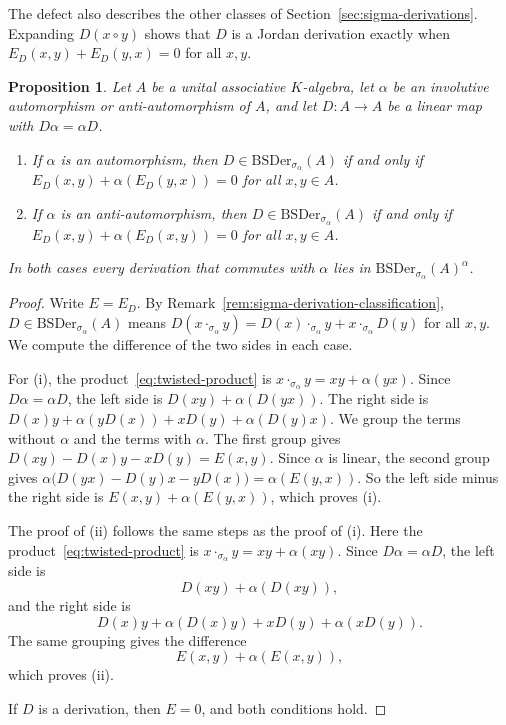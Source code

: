 \documentclass[]{interact}
\theoremstyle{plain}
\newtheorem{proposition}[theorem]{Proposition}
\theoremstyle{definition}
\theoremstyle{remark}
\newcommand{\BSDer}{\mathrm{BSDer}}
\begin{document}
The defect also describes the other classes of Section~\ref{sec:sigma-derivations}.
Expanding $D(x \circ y)$ shows that $D$ is a Jordan derivation exactly when $E_D(x,y) + E_D(y,x) = 0$ for all $x, y$.

\begin{proposition}\label{prop:defect}
Let $A$ be a unital associative $K$-algebra, let $\alpha$ be an involutive automorphism or anti-automorphism of $A$, and let $D \colon A \to A$ be a linear map with $D\alpha = \alpha D$.
\begin{enumerate}[label=(\roman*)]
\item If $\alpha$ is an automorphism, then $D \in \BSDer_{\sigma_\alpha}(A)$ if and only if $E_D(x,y) + \alpha(E_D(y,x)) = 0$ for all $x, y \in A$.
\item If $\alpha$ is an anti-automorphism, then $D \in \BSDer_{\sigma_\alpha}(A)$ if and only if $E_D(x,y) + \alpha(E_D(x,y)) = 0$ for all $x, y \in A$.
\end{enumerate}
In both cases every derivation that commutes with $\alpha$ lies in $\BSDer_{\sigma_\alpha}(A)^\alpha$.
\end{proposition}

\begin{proof}
Write $E = E_D$.
By Remark~\ref{rem:sigma-derivation-classification}, $D \in \BSDer_{\sigma_\alpha}(A)$ means $D(x \cdot_{\sigma_\alpha} y) = D(x) \cdot_{\sigma_\alpha} y + x \cdot_{\sigma_\alpha} D(y)$ for all $x, y$.
We compute the difference of the two sides in each case.

For (i), the product~\eqref{eq:twisted-product} is $x \cdot_{\sigma_\alpha} y = xy + \alpha(yx)$.
Since $D\alpha = \alpha D$, the left side is $D(xy) + \alpha(D(yx))$.
The right side is $D(x)y + \alpha(yD(x)) + xD(y) + \alpha(D(y)x)$.
We group the terms without $\alpha$ and the terms with $\alpha$.
The first group gives $D(xy) - D(x)y - xD(y) = E(x,y)$.
Since $\alpha$ is linear, the second group gives $\alpha\bigl(D(yx) - D(y)x - yD(x)\bigr) = \alpha(E(y,x))$.
So the left side minus the right side is $E(x,y) + \alpha(E(y,x))$, which proves (i).

The proof of (ii) follows the same steps as the proof of (i).
Here the product~\eqref{eq:twisted-product} is $x \cdot_{\sigma_\alpha} y = xy + \alpha(xy)$.
Since $D\alpha = \alpha D$, the left side is
\[
D(xy) + \alpha(D(xy)),
\]
and the right side is
\[
D(x)y + \alpha(D(x)y) + xD(y) + \alpha(xD(y)).
\]
The same grouping gives the difference
\[
E(x,y) + \alpha(E(x,y)),
\]
which proves (ii).

If $D$ is a derivation, then $E = 0$, and both conditions hold.
\end{proof}
\end{document}
